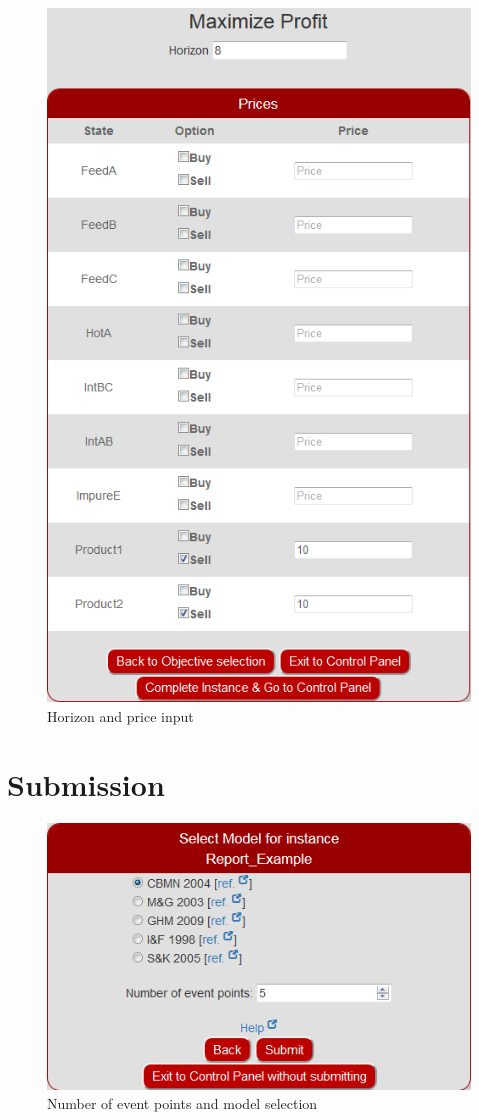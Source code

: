 \begin{figure}[htbp]
\centering
\includegraphics[width=0.8\linewidth]{Images/Prices.png}
\caption{Horizon and price input}
\label{fig:prices}
\end{figure}

\section{Submission}

\begin{figure}[htbp]
\centering
\includegraphics[width=0.8\linewidth]{Images/SelectModel.png}
\caption{Number of event points and model selection}
\label{fig:selectModel}
\end{figure}


